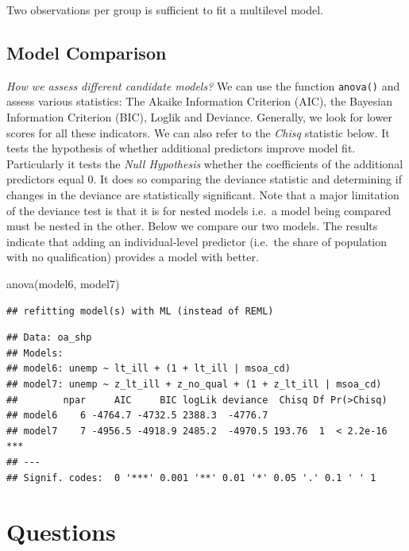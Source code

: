 \documentclass[
]{book}
\newenvironment{Shaded}{\begin{snugshade}}{\end{snugshade}}
\newcommand{\FunctionTok}[1]{\textcolor[rgb]{0.00,0.00,0.00}{#1}}
\newcommand{\NormalTok}[1]{#1}
\begin{document}
Two observations per group is sufficient to fit a multilevel model.

\hypertarget{model-comparison}{%
\subsection{Model Comparison}\label{model-comparison}}

\emph{How we assess different candidate models?} We can use the function \texttt{anova()} and assess various statistics: The Akaike Information Criterion (AIC), the Bayesian Information Criterion (BIC), Loglik and Deviance. Generally, we look for lower scores for all these indicators. We can also refer to the \emph{Chisq} statistic below. It tests the hypothesis of whether additional predictors improve model fit. Particularly it tests the \emph{Null Hypothesis} whether the coefficients of the additional predictors equal 0. It does so comparing the deviance statistic and determining if changes in the deviance are statistically significant. Note that a major limitation of the deviance test is that it is for nested models i.e.~a model being compared must be nested in the other. Below we compare our two models. The results indicate that adding an individual-level predictor (i.e.~the share of population with no qualification) provides a model with better.

\begin{Shaded}
\begin{Highlighting}[]
\FunctionTok{anova}\NormalTok{(model6, model7)}
\end{Highlighting}
\end{Shaded}

\begin{verbatim}
## refitting model(s) with ML (instead of REML)
\end{verbatim}

\begin{verbatim}
## Data: oa_shp
## Models:
## model6: unemp ~ lt_ill + (1 + lt_ill | msoa_cd)
## model7: unemp ~ z_lt_ill + z_no_qual + (1 + z_lt_ill | msoa_cd)
##        npar     AIC     BIC logLik deviance  Chisq Df Pr(>Chisq)    
## model6    6 -4764.7 -4732.5 2388.3  -4776.7                         
## model7    7 -4956.5 -4918.9 2485.2  -4970.5 193.76  1  < 2.2e-16 ***
## ---
## Signif. codes:  0 '***' 0.001 '**' 0.01 '*' 0.05 '.' 0.1 ' ' 1
\end{verbatim}

\hypertarget{questions-4}{%
\section{Questions}\label{questions-4}}
\end{document}
